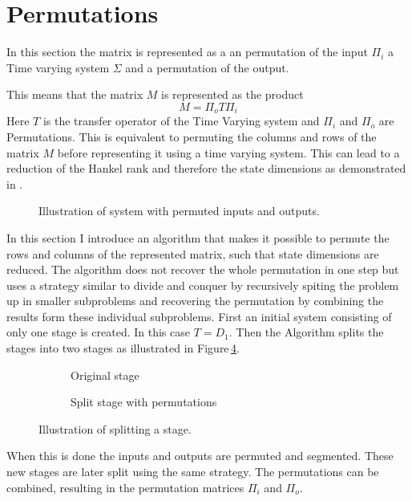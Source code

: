 \documentclass[doctype=mastersthesis,BCOR=15mm,biblatex]{ldvbook}%
\begin{document}
 

\section{Permutations}\label{sec:permutation}

In this section the matrix is represented as a an permutation of the input $\Pi_i$ a Time varying system $\Sigma$ and a permutation of the output.

This means that the matrix $M$ is represented as the product
\begin{equation}
	M = \Pi_o T \Pi_i
\end{equation}
Here $T$ is the transfer operator of the Time Varying system and $\Pi_i$ and $\Pi_o$ are Permutations.
This is equivalent to permuting the columns and rows of the matrix $M$ before representing it using a time varying system.
This can lead to a reduction of the Hankel rank and therefore the state dimensions as demonstrated in \cite{diepold_optic_2004}. 
\begin{figure}[!htb]
	\centering
	
	\caption{Illustration of system with permuted inputs and outputs.}
	\label{fig:system_permuted}
\end{figure}
In this section I introduce an algorithm that makes it possible to permute the rows and columns of the represented matrix, such that state dimensions are reduced.
The algorithm does not recover the whole permutation in one step but uses a strategy similar to divide and conquer by recursively spiting the problem up in smaller subproblems and recovering the permutation by combining the results form these individual subproblems.
First an initial system consisting of only one stage is created.
In this case $T = D_1$.
Then the Algorithm splits the stages into two stages  as illustrated in Figure\,\ref{fig:split_permute}.
\begin{figure}[!htb]
	\centering
	
	\begin{subfigure}[b]{0.45\textwidth}
		\caption{Original stage}
		\label{fig:split_permute_a}
	\end{subfigure}
	\hspace{0.8cm}
	\begin{subfigure}[b]{0.45\textwidth}
		\caption{Split stage with permutations}
		\label{fig:split_permute_b}
	\end{subfigure}
	\caption{Illustration of splitting a stage.}
	\label{fig:split_permute}
\end{figure}
When this is done the inputs and outputs are permuted and segmented.
These new stages are later split using the same strategy.
The permutations can be combined, resulting in the permutation matrices $\Pi_i$ and $\Pi_o$.
\end{document}
